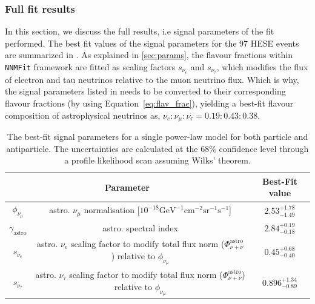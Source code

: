 \subsubsection{Full fit results}
\label{final_fit}
In this section, we discuss the full results, i.e signal parameters of the fit performed. The best fit values of the signal parameters for the 97 HESE events are summarized in . As explained in \ref{sec:params}, the flavour fractions within \texttt{NNMFit} framework are fitted as scaling factors $s_{\nu_{e}}$ and $s_{\nu_{\tau}}$, which modifies the flux of electron and tau neutrinos relative to the muon neutrino flux. Which is why, the signal parameters listed in  needs to be converted to their corresponding flavour fractions (by using Equation~\ref{eq:flav_frac}), yielding a best-fit flavour composition of astrophysical neutrinos as, \textbf{$\nu_e:\nu_{\mu}:\nu_{\tau} = 0.19:0.43:0.38$}.

\begin{table}[h]
    \caption{The best-fit signal parameters for a single power-law model for both particle and antiparticle. The uncertainties are calculated at the 68\% confidence level through a profile likelihood scan assuming Wilks' theorem.}
    {\renewcommand{\arraystretch}{1.4}
    \begin{tabular}{ c c |c}
        
        \hline
        \multicolumn{2}{c|}{Parameter}  & Best-Fit value\\
        \hline
        \hline
        $\phi_{\nu_{\mu}}$ &astro. $\nu_{\mu}$ normalisation [$10^{-18} \mathrm{GeV}^{-1}\mathrm{cm}^{-2}\mathrm{sr}^{-1}\mathrm{s}^{-1}$]& $2.53_{-1.49}^{+1.78}$\\
        \hline
        $\gamma_{\mathrm{astro}}$ &astro. spectral index & $2.84_{-0.18}^{+0.19}$\\
        \hline
        $s_{\nu_e}$ &astro. $\nu_{e}$ scaling factor to modify total flux norm ($\Phi_{\nu+\bar\nu}^{\mathrm{astro}}$) relative to $\phi_{\nu_{\mu}}$ & $0.45_{-0.40}^{+0.68}$\\
        \hline
        $s_{\nu_{\tau}}$ &astro. $\nu_{\tau}$ scaling factor to modify total flux norm ($\Phi_{\nu+\bar\nu}^{\mathrm{astro}}$) relative to $\phi_{\nu_{\mu}}$ & $0.896_{-0.89}^{+1.34}$\\
        \hline
        \hline
    \end{tabular}
    }
\end{table}


